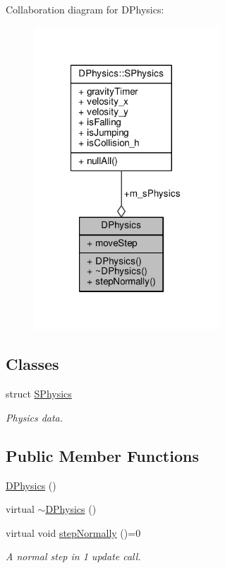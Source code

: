 Collaboration diagram for D\-Physics\-:
\nopagebreak
\begin{figure}[H]
\begin{center}
\leavevmode
\includegraphics[width=197pt]{classDPhysics__coll__graph}
\end{center}
\end{figure}
\subsection*{Classes}
\begin{DoxyCompactItemize}
\item 
struct \hyperlink{structDPhysics_1_1SPhysics}{S\-Physics}
\begin{DoxyCompactList}\small\item\em Physics data. \end{DoxyCompactList}\end{DoxyCompactItemize}
\subsection*{Public Member Functions}
\begin{DoxyCompactItemize}
\item 
\hyperlink{classDPhysics_a3ce58ebc308881f3eb0cff60ff1eff45}{D\-Physics} ()
\item 
virtual \hyperlink{classDPhysics_aad555af54aca363984d0fcf34d044ba5}{$\sim$\-D\-Physics} ()
\item 
virtual void \hyperlink{classDPhysics_a414316ffcec06dbf01ced086bbb92b55}{step\-Normally} ()=0
\begin{DoxyCompactList}\small\item\em A normal step in 1 update call. \end{DoxyCompactList}\end{DoxyCompactItemize}
